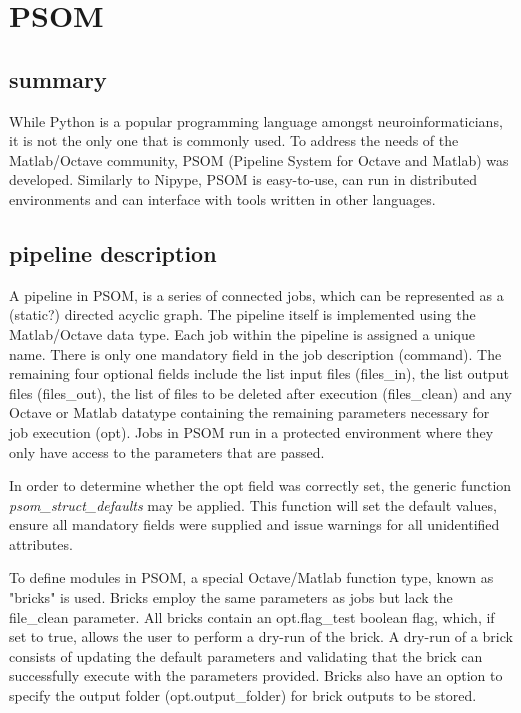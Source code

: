 \documentclass{report}
\begin{document}
    \section{PSOM} 
        \subsection{summary} 
        While Python is a popular programming language amongst
neuroinformaticians, it is not the only one that is commonly used. To address
the needs of the Matlab/Octave community, PSOM (Pipeline System for Octave and
Matlab) was developed. Similarly to Nipype, PSOM is easy-to-use, can run in
distributed environments and can interface with tools written in other
languages.

        \subsection{pipeline description}
        A pipeline in PSOM, is a series of connected jobs, which can be
represented as a (static?) directed acyclic graph. The pipeline itself is implemented 
using the Matlab/Octave data type. Each job within the pipeline
is assigned a unique name. There is only one mandatory field in the job
description (command). The remaining four optional fields include the list input
files (files\_in), the list output files (files\_out), the list of files to be
deleted after execution (files\_clean) and any Octave or Matlab datatype
containing the remaining parameters necessary for job execution (opt).
Jobs in PSOM run in a protected environment where they only have access to the
parameters that are passed. 

        In order to determine whether the opt field was correctly set, the
generic function \textit{psom\_struct\_defaults} may be applied. This function
will set the default values, ensure all mandatory fields were supplied and issue
warnings for all unidentified attributes.

        To define modules in PSOM, a special Octave/Matlab function type, known as "bricks"
is used. Bricks employ the same parameters as jobs but lack the file\_clean
parameter. All bricks contain an opt.flag\_test boolean flag, which, if set to
true, allows the user to perform a dry-run of the brick. A dry-run of a brick
consists of updating the default parameters and validating that the brick can
successfully execute with the parameters provided. Bricks also have an option to
specify the output folder (opt.output\_folder) for brick outputs to be stored.
\end{document}
